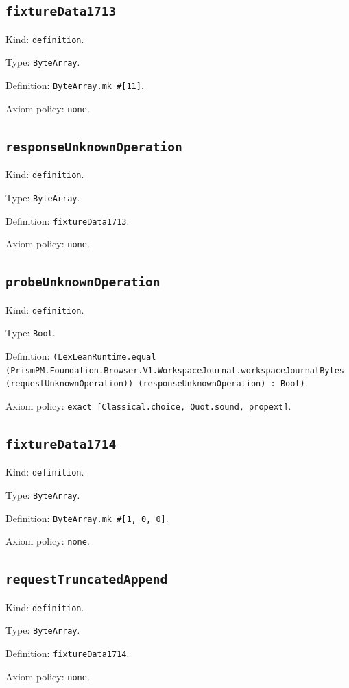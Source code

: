 \documentclass[11pt]{article}
\begin{document}
\subsection*{\texttt{fixtureData1713}}
\noindent Kind: \texttt{definition}.\par
\noindent Type: \texttt{ByteArray}.\par
\noindent Definition: \texttt{ByteArray.mk \#[11]}.\par
\noindent Axiom policy: \texttt{none}.\par
\subsection*{\texttt{responseUnknownOperation}}
\noindent Kind: \texttt{definition}.\par
\noindent Type: \texttt{ByteArray}.\par
\noindent Definition: \texttt{fixtureData1713}.\par
\noindent Axiom policy: \texttt{none}.\par
\subsection*{\texttt{probeUnknownOperation}}
\noindent Kind: \texttt{definition}.\par
\noindent Type: \texttt{Bool}.\par
\noindent Definition: \texttt{(LexLeanRuntime.equal (PrismPM.Foundation.Browser.V1.WorkspaceJournal.workspaceJournalBytes (requestUnknownOperation)) (responseUnknownOperation) : Bool)}.\par
\noindent Axiom policy: \texttt{exact [Classical.choice, Quot.sound, propext]}.\par
\subsection*{\texttt{fixtureData1714}}
\noindent Kind: \texttt{definition}.\par
\noindent Type: \texttt{ByteArray}.\par
\noindent Definition: \texttt{ByteArray.mk \#[1, 0, 0]}.\par
\noindent Axiom policy: \texttt{none}.\par
\subsection*{\texttt{requestTruncatedAppend}}
\noindent Kind: \texttt{definition}.\par
\noindent Type: \texttt{ByteArray}.\par
\noindent Definition: \texttt{fixtureData1714}.\par
\noindent Axiom policy: \texttt{none}.\par
\end{document}
